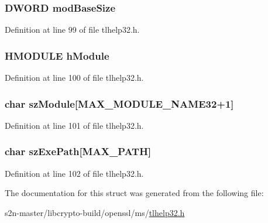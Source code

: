 \subsubsection[{\texorpdfstring{mod\+Base\+Size}{modBaseSize}}]{\setlength{\rightskip}{0pt plus 5cm}D\+W\+O\+RD mod\+Base\+Size}\hypertarget{structtag_m_o_d_u_l_e_e_n_t_r_y32_a98886f2c939d29359f700bea645b9cf6}{}\label{structtag_m_o_d_u_l_e_e_n_t_r_y32_a98886f2c939d29359f700bea645b9cf6}


Definition at line 99 of file tlhelp32.\+h.

\subsubsection[{\texorpdfstring{h\+Module}{hModule}}]{\setlength{\rightskip}{0pt plus 5cm}H\+M\+O\+D\+U\+LE h\+Module}\hypertarget{structtag_m_o_d_u_l_e_e_n_t_r_y32_ae3642ec58b041930c54b501841cc736d}{}\label{structtag_m_o_d_u_l_e_e_n_t_r_y32_ae3642ec58b041930c54b501841cc736d}


Definition at line 100 of file tlhelp32.\+h.

\subsubsection[{\texorpdfstring{sz\+Module}{szModule}}]{\setlength{\rightskip}{0pt plus 5cm}char sz\+Module\mbox{[}{\bf M\+A\+X\+\_\+\+M\+O\+D\+U\+L\+E\+\_\+\+N\+A\+M\+E32}+1\mbox{]}}\hypertarget{structtag_m_o_d_u_l_e_e_n_t_r_y32_ad3a4a8a7917fd8c3717062d9741499fc}{}\label{structtag_m_o_d_u_l_e_e_n_t_r_y32_ad3a4a8a7917fd8c3717062d9741499fc}


Definition at line 101 of file tlhelp32.\+h.

\subsubsection[{\texorpdfstring{sz\+Exe\+Path}{szExePath}}]{\setlength{\rightskip}{0pt plus 5cm}char sz\+Exe\+Path\mbox{[}M\+A\+X\+\_\+\+P\+A\+TH\mbox{]}}\hypertarget{structtag_m_o_d_u_l_e_e_n_t_r_y32_af9188a9b3d822b6f0a2767cbbfac0e21}{}\label{structtag_m_o_d_u_l_e_e_n_t_r_y32_af9188a9b3d822b6f0a2767cbbfac0e21}


Definition at line 102 of file tlhelp32.\+h.



The documentation for this struct was generated from the following file\+:\begin{DoxyCompactItemize}
\item 
s2n-\/master/libcrypto-\/build/openssl/ms/\hyperlink{tlhelp32_8h}{tlhelp32.\+h}\end{DoxyCompactItemize}
